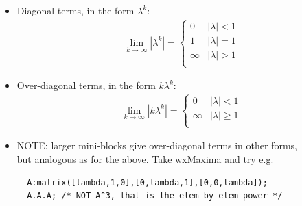 \begin{frame}[fragile]
\myPause
 \begin{itemize}[<+-| alert@+>]
 \item Diagonal terms, in the form $\lambda^k$:
       \begin{displaymath}
        \begin{array}{rcl}
         \lim\limits_{k\rightarrow\infty}|\lambda^k| = 
          \begin{cases}
           0        & |\lambda| < 1 \\
           1        & |\lambda| = 1 \\
           \infty   & |\lambda| > 1 \\
          \end{cases}
        \end{array}
       \end{displaymath}
 \item Over-diagonal terms, in the form $k\lambda^k$:
       \begin{displaymath}
        \begin{array}{rcl}
         \lim\limits_{k\rightarrow\infty}|k\lambda^k| = 
          \begin{cases}
           0        & |\lambda| < 1 \\
           \infty   & |\lambda| \geq 1 \\
          \end{cases}
        \end{array}
       \end{displaymath}
 \item NOTE: larger mini-blocks give over-diagonal terms in other forms,\\
       but analogous as for the above. Take wxMaxima and try e.g.\\
       {\small
       \begin{verbatim}
  A:matrix([lambda,1,0],[0,lambda,1],[0,0,lambda]);
  A.A.A; /* NOT A^3, that is the elem-by-elem power */
       \end{verbatim}
       }
 \end{itemize}
\end{frame}

